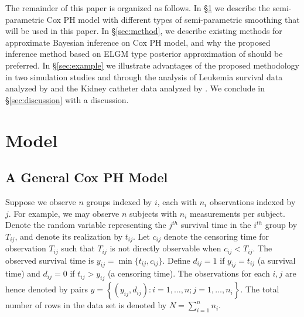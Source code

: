 \documentclass[ba]{imsart}
\begin{document}
The remainder of this paper is organized as follows. In \S\ref{sec:model} we describe the semi-parametric Cox PH model with different types of semi-parametric smoothing that will be used in this paper. In \S\ref{sec:method}, we describe existing methods for approximate Bayesian inference on Cox PH model, and why the proposed inference method based on ELGM type posterior approximation of \cite{ELGM} should be preferred. In \S\ref{sec:example} we illustrate advantages of the proposed methodology in two simulation studies and through the analysis of Leukemia survival data analyzed by \cite{inlacoxph} and the Kidney catheter data analyzed by \cite{kidney}. We conclude in \S\ref{sec:discussion} with a discussion.

\section{Model}\label{sec:model}

\subsection{A General Cox PH Model}

Suppose we observe $n$ groups indexed by $i$, each with $n_{i}$ observations indexed by $j$. For example, we may observe $n$ subjects with $n_{i}$ measurements per subject. Denote the random variable representing the $j^{th}$ survival time in the $i^{th}$ group by $T_{ij}$, and denote its realization by $t_{ij}$. Let $c_{ij}$ denote the censoring time for observation $T_{ij}$ such that $T_{ij}$ is not directly observable when $c_{ij} < T_{ij}$. The observed survival time is $y_{ij} = \min\{t_{ij},c_{ij}\}$. Define $d_{ij} = 1$ if $y_{ij} = t_{ij}$ (a survival time) and $d_{ij} = 0$ if $t_{ij} > y_{ij}$ (a censoring time). The observations for each $i,j$ are hence denoted by pairs $y =  \left\{(y_{ij},d_{ij}): i = 1,\ldots,n; j = 1,\ldots,n_{i} \right\}$. The total number of rows in the data set is denoted by $N = \sum_{i=1}^{n}n_{i}$.
\end{document}
